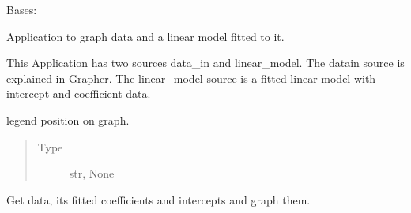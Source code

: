 \documentclass[letterpaper,10pt,english]{sphinxmanual}
\begin{document}
\begin{fulllineitems}
\label{\detokenize{dalio.application:dalio.application.graphers.LMGrapher}}
Bases: {\hyperref[\detokenize{dalio.application:dalio.application.graphers.PandasXYGrapher}]{}}

Application to graph data and a linear model fitted to it.

This Application has two sources data\_in and linear\_model. The data\sphinxhyphen{}in
source is explained in Grapher. The linear\_model source is a fitted
linear model with intercept and coefficient data.

\begin{fulllineitems}
\label{\detokenize{dalio.application:dalio.application.graphers.LMGrapher._legend}}
legend position on graph.
\begin{quote}\begin{description}
\item[{Type}] \leavevmode
str, None

\end{description}\end{quote}

\end{fulllineitems}


\begin{fulllineitems}
\label{\detokenize{dalio.application:dalio.application.graphers.LMGrapher.run}}
Get data, its fitted coefficients and intercepts and graph them.

\end{fulllineitems}


\end{fulllineitems}

\end{document}
